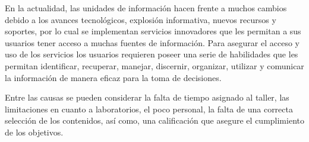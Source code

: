 En la actualidad, las unidades de información hacen frente a muchos cambios
debido a los avances tecnológicos, explosión informativa, nuevos recursos y
soportes, por lo cual se implementan servicios innovadores que les permitan a
sus usuarios tener acceso a muchas fuentes de información. Para asegurar el
acceso y uso de los servicios los usuarios requieren poseer una serie de
habilidades que les permitan identificar, recuperar, manejar, discernir,
organizar, utilizar y comunicar la información de manera eficaz para la toma de
decisiones.

Entre las causas se pueden considerar la falta de tiempo asignado al taller,
las limitaciones en cuanto a laboratorios, el poco personal, la falta de una
correcta selección de los contenidos, así como, una calificación que asegure el
cumplimiento de los objetivos.

